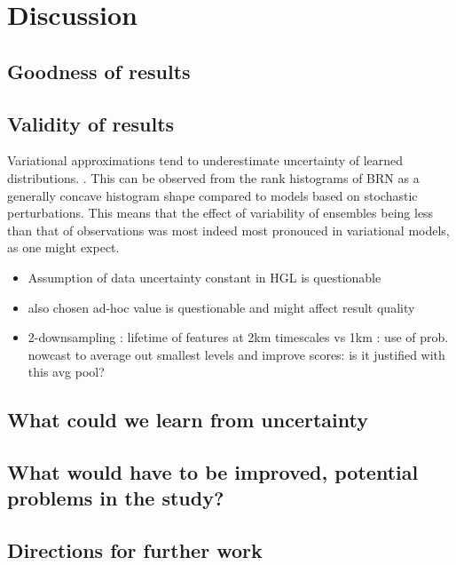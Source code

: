 \chapter{Discussion}
\label{chapter:discussion}

\section{Goodness of results}
\section{Validity of results}

Variational approximations tend to underestimate uncertainty of learned distributions. \cite{bishop2006pattern, minka_family_nodate}. This can be observed from the rank histograms of BRN as a generally concave histogram shape compared to models based on stochastic perturbations. This means that the effect of variability of ensembles being less than that of observations was most indeed most pronouced in variational models, as one might expect. 

\begin{itemize}
	\item Assumption of data uncertainty constant in HGL is questionable
	\item also chosen ad-hoc value is questionable and might affect result quality 
	\item 2-downsampling : lifetime of features at 2km timescales vs 1km : use of prob. nowcast to average out smallest levels and improve scores: is it justified with this avg pool?
\end{itemize}
\section{What could we learn from uncertainty}

\section{What would have to be improved, potential problems in the study?}

\section{Directions for further work}

